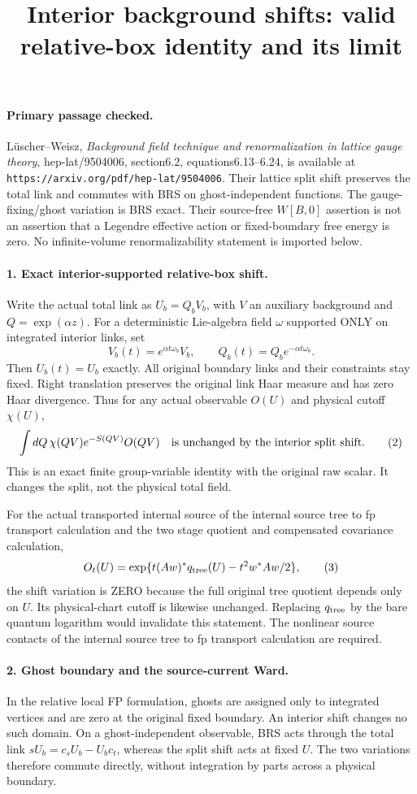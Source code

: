 \documentclass[11pt]{article}
\title{Interior background shifts: valid relative-box identity and its limit}\author{}\date{}
\begin{document}
\maketitle
\paragraph{Primary passage checked.}
L\"uscher--Weisz, \emph{Background field technique and renormalization
in lattice gauge theory}, hep-lat/9504006, section6.2,
equations6.13--6.24, is available at
\texttt{https://arxiv.org/pdf/hep-lat/9504006}.
Their lattice split shift preserves the total link and commutes with
BRS on ghost-independent functions. The gauge-fixing/ghost variation
is BRS exact. Their source-free $W[B,0]$ assertion is not an assertion
that a Legendre effective action or fixed-boundary free energy is zero.
No infinite-volume renormalizability statement is imported below.

\paragraph{1. Exact interior-supported relative-box shift.}
Write the actual total link as $U_b=Q_bV_b$, with $V$ an auxiliary
background and $Q=\exp(\alpha z)$. For a deterministic Lie-algebra
field $\omega$ supported ONLY on integrated interior links, set
\[
 V_b(t)=e^{\alpha t\omega_b}V_b,\qquad
 Q_b(t)=Q_b e^{-\alpha t\omega_b}. \tag{1}
\]
Then $U_b(t)=U_b$ exactly. All original boundary links and their
constraints stay fixed. Right translation preserves the original
link Haar measure and has zero Haar divergence.
Thus for any actual observable $O(U)$ and physical cutoff $\chi(U)$,
\[
 \int dQ\,\chi(QV)e^{-S(QV)}O(QV)
 \quad\hbox{is unchanged by the interior split shift.} \tag{2}
\]
This is an exact finite group-variable identity with the original
raw scalar. It changes the split, not the physical total field.

For the actual transported internal source of the internal source tree to fp transport calculation and the two stage quotient and compensated covariance calculation,
\[
 O_t(U)=\exp\{t(Aw)^*q_{\rm tree}(U)-t^2w^*Aw/2\}, \tag{3}
\]
the shift variation is ZERO because the full original tree quotient
depends only on $U$. Its physical-chart cutoff is likewise unchanged.
Replacing $q_{\rm tree}$ by the bare quantum logarithm would invalidate
this statement. The nonlinear source contacts of the internal source tree to fp transport calculation are required.

\paragraph{2. Ghost boundary and the source-current Ward.}
In the relative local FP formulation, ghosts are assigned only to
integrated vertices and are zero at the original fixed boundary.
An interior shift changes no such domain. On a ghost-independent
observable, BRS acts through the total link
$sU_b=c_sU_b-U_bc_t$, whereas the split shift acts at fixed $U$.
The two variations therefore commute directly, without integration
by parts across a physical boundary.
\end{document}
